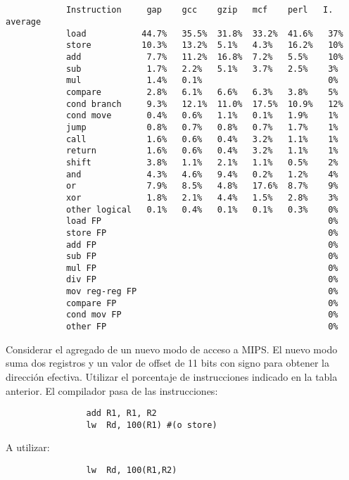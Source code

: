 \subsection{}
	  \begin{small}
			\begin{verbatim}                                   
			Instruction     gap    gcc    gzip   mcf    perl   I. average
			load           44.7%   35.5%  31.8%  33.2%  41.6%   37%
			store          10.3%   13.2%  5.1%   4.3%   16.2%   10%
			add             7.7%   11.2%  16.8%  7.2%   5.5%    10%
			sub             1.7%   2.2%   5.1%   3.7%   2.5%    3%
			mul             1.4%   0.1%                         0%
			compare         2.8%   6.1%   6.6%   6.3%   3.8%    5%
			cond branch     9.3%   12.1%  11.0%  17.5%  10.9%   12%
			cond move       0.4%   0.6%   1.1%   0.1%   1.9%    1%
			jump            0.8%   0.7%   0.8%   0.7%   1.7%    1%
			call            1.6%   0.6%   0.4%   3.2%   1.1%    1%
			return          1.6%   0.6%   0.4%   3.2%   1.1%    1%
			shift           3.8%   1.1%   2.1%   1.1%   0.5%    2%
			and             4.3%   4.6%   9.4%   0.2%   1.2%    4%
			or              7.9%   8.5%   4.8%   17.6%  8.7%    9%
			xor             1.8%   2.1%   4.4%   1.5%   2.8%    3%
			other logical   0.1%   0.4%   0.1%   0.1%   0.3%    0%
			load FP                                             0%
			store FP                                            0%
			add FP                                              0%
			sub FP                                              0%
			mul FP                                              0%
			div FP                                              0%
			mov reg-reg FP                                      0%
			compare FP                                          0%
			cond mov FP                                         0%
			other FP                                            0%
			\end{verbatim}
			\end{small}
		
			Considerar el agregado de un nuevo modo de acceso a MIPS.
			El nuevo modo suma dos registros y un valor de offset de 11 bits con signo para obtener
			la dirección efectiva. Utilizar el porcentaje de instrucciones indicado en la tabla anterior.
			\vspace{3mm}
			El compilador pasa de las instrucciones: 
			\begin{verbatim}
			    add R1, R1, R2
			    lw  Rd, 100(R1) #(o store)
			\end{verbatim}
			\vspace{1.5mm}
			A utilizar:
			\begin{verbatim}
			    lw	Rd, 100(R1,R2)
			\end{verbatim}
			
